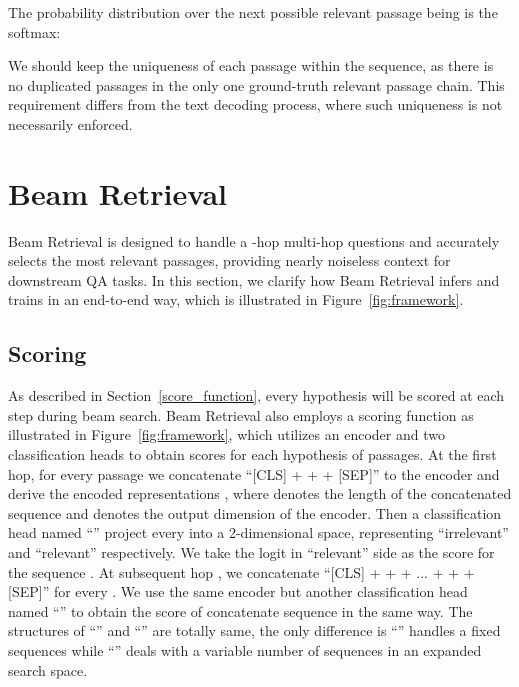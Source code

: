 \documentclass[10.5pt]{article}
\begin{document}
The probability distribution over the next possible relevant passage being  is the softmax:



We should keep the uniqueness of each passage within the sequence, as there is no duplicated passages in the only one ground-truth relevant passage chain. This requirement differs from the text decoding process, where such uniqueness is not necessarily enforced.

\section{Beam Retrieval}\label{beam_retrieval_method}
Beam Retrieval is designed to handle a -hop multi-hop questions  and accurately selects the most relevant passages, providing nearly noiseless context for downstream QA tasks. In this section, we clarify how Beam Retrieval infers and trains in an end-to-end way, which is illustrated in Figure~\ref{fig:framework}.

\subsection{Scoring}
As described in Section~\ref{score_function}, every hypothesis will be scored at each step during beam search. Beam Retrieval also employs a scoring function  as illustrated in Figure~\ref{fig:framework}, which utilizes an encoder and two classification heads to obtain scores for each hypothesis of passages. At the first hop, for every passage  we concatenate ``[CLS] +  +  + [SEP]'' to the encoder and derive the encoded  representations , where  denotes the length of the concatenated sequence and  denotes the output dimension of the encoder. Then a classification head named ``'' project every  into a 2-dimensional space, representing  ``irrelevant'' and ``relevant'' respectively. We take the logit in ``relevant'' side as the score for the sequence . At subsequent hop , we concatenate ``[CLS] +  +  + ... +  +  + [SEP]'' for every . We use the same encoder but another classification head named ``'' to obtain the score of concatenate sequence  in the same way.  The structures of ``'' and ``'' are totally same, the only difference is ``'' handles a fixed  sequences while ``'' deals with a variable number of sequences in an expanded search space.
\end{document}
